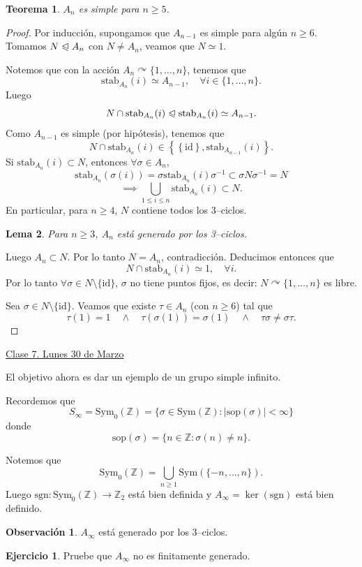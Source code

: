 \documentclass{article}
\newtheorem{theorem}{Teorema}[subsection]
\newtheorem{lemma}[theorem]{Lema}
\theoremstyle{definition}
\newtheorem{exercise}{Ejercicio}
\newtheorem*{obs}{Observación}
\theoremstyle{remark}
\numberwithin{equation}{section}
\newcommand{\Z}{\mathbb{Z}}
\newcommand{\oo}{\infty}
\newcommand{\acts}{\curvearrowright}
\newcommand{\normal}{\trianglelefteqslant}
\newcommand{\sgn}{\mathrm{sgn}}
\newcommand{\id}{\mathrm{id}}
\newcommand{\Sym}{\mathrm{Sym}}
\newcommand{\stab}{\mathrm{stab}}
\newcommand{\sop}{\mathrm{sop}}
\newcommand{\abs}[1]{\left| #1 \right|}
\newcommand{\set}[1]{\left\{ #1 \right\}}
\newcommand{\fecha}[1]{\begin{flushright} \underline{#1} \end{flushright}}
\begin{document}
\begin{theorem}
  $A_n$ es simple para $n \geq 5$.
\end{theorem}
\begin{proof}
  Por inducción, supongamos que $A_{n-1}$ es simple para algún $n \geq 6$.
  Tomamos $N \normal A_n$ con $N \neq A_n$, veamos que $N \simeq 1$.

  Notemos que con la acción $A_n \acts \{1,\dots,n\}$, tenemos que $$\stab_{A_n}(i) \simeq A_{n-1}, \quad \forall i \in \{1,\dots,n\}.$$
  Luego $$N \cap \stab_{A_n}(i) \normal \stab_{A_n}(i) \simeq A_{n-1}.$$
  Como $A_{n-1}$ es simple (por hipótesis), tenemos que
  \[N \cap \stab_{A_n}(i) \in \set{\set{\id}, \stab_{A_{n-1}}(i)}.\]
  Si $\stab_{A_n}(i) \subset N$, entonces $\forall \sigma \in A_n$,
  \[\stab_{A_n}(\sigma(i)) = \sigma \stab_{A_n}(i) \sigma^{-1} \subset \sigma N \sigma^{-1} = N\]
  \[\implies \bigcup_{1 \leq i \leq n} \stab_{A_n}(i) \subset N.\]
  En particular, para $n \geq 4$, $N$ contiene todos los 3--ciclos.
  \begin{lemma}
    Para $n \geq 3$, $A_n$ está generado por los 3--ciclos.
  \end{lemma}
  Luego $A_n \subset N$. Por lo tanto $N = A_n$, contradicción. Deducimos entonces que
  \[N \cap \stab_{A_n}(i) \simeq 1, \quad \forall i.\]
  Por lo tanto $\forall \sigma \in N \setminus \{\id\}$, $\sigma$ no tiene puntos fijos, es decir: $N \acts \{1,\dots,n\}$ es libre.

  Sea $\sigma \in N \setminus \{\id\}$. Veamos que existe $\tau \in A_n$ (con $n \geq 6$) tal que
  \[\tau(1) = 1 \quad\land\quad \tau(\sigma(1)) = \sigma(1) \quad\land\quad \tau\sigma \neq \sigma\tau.\]
\end{proof}

\fecha{Clase 7. Lunes 30 de Marzo}

El objetivo ahora es dar un ejemplo de un grupo simple infinito.

Recordemos que
\[S_\oo = \Sym_0(\Z) = \{\sigma \in \Sym(\Z) : \abs{\sop(\sigma)} < \oo\}\]
donde $$\sop(\sigma) = \{n \in \Z : \sigma(n) \neq n\}.$$

Notemos que
\[\Sym_0(\Z) = \bigcup_{n \geq 1} \Sym(\{-n, \dots, n\}).\]
Luego $\sgn \colon \Sym_0(\Z) \to \Z_2$ está bien definida y $A_\oo = \ker(\sgn)$ está bien definido.

\begin{obs}
  $A_\oo$ está generado por los 3--ciclos.
\end{obs}

\begin{exercise}
  Pruebe que $A_\oo$ no es finitamente generado.
\end{exercise}
\end{document}
